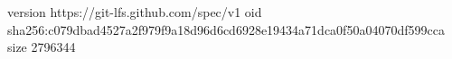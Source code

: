 version https://git-lfs.github.com/spec/v1
oid sha256:c079dbad4527a2f979f9a18d96d6cd6928e19434a71dca0f50a04070df599cca
size 2796344
